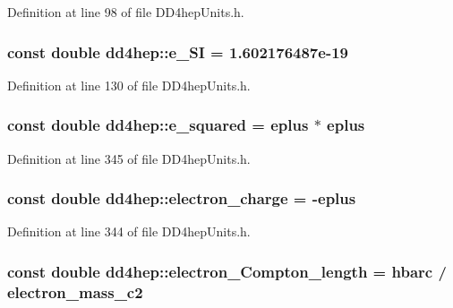 Definition at line 98 of file DD4hepUnits.h.\hypertarget{namespacedd4hep_a18365e1a8b0f1730924219e336e11e9f}{
\subsubsection[{e\_\-SI}]{\setlength{\rightskip}{0pt plus 5cm}const double {\bf dd4hep::e\_\-SI} = 1.602176487e-\/19}}
\label{namespacedd4hep_a18365e1a8b0f1730924219e336e11e9f}


Definition at line 130 of file DD4hepUnits.h.\hypertarget{namespacedd4hep_a23b1828a7d7d90dc182eee3716cf27f6}{
\subsubsection[{e\_\-squared}]{\setlength{\rightskip}{0pt plus 5cm}const double {\bf dd4hep::e\_\-squared} = {\bf eplus} $\ast$ {\bf eplus}}}
\label{namespacedd4hep_a23b1828a7d7d90dc182eee3716cf27f6}


Definition at line 345 of file DD4hepUnits.h.\hypertarget{namespacedd4hep_ab3cc7a4c1edb82d85112753196db9368}{
\subsubsection[{electron\_\-charge}]{\setlength{\rightskip}{0pt plus 5cm}const double {\bf dd4hep::electron\_\-charge} = -\/{\bf eplus}}}
\label{namespacedd4hep_ab3cc7a4c1edb82d85112753196db9368}


Definition at line 344 of file DD4hepUnits.h.\hypertarget{namespacedd4hep_ae9b92fa47cc9555cea0d6fa97a9036a3}{
\subsubsection[{electron\_\-Compton\_\-length}]{\setlength{\rightskip}{0pt plus 5cm}const double {\bf dd4hep::electron\_\-Compton\_\-length} = {\bf hbarc} / {\bf electron\_\-mass\_\-c2}}}
\label{namespacedd4hep_ae9b92fa47cc9555cea0d6fa97a9036a3}


